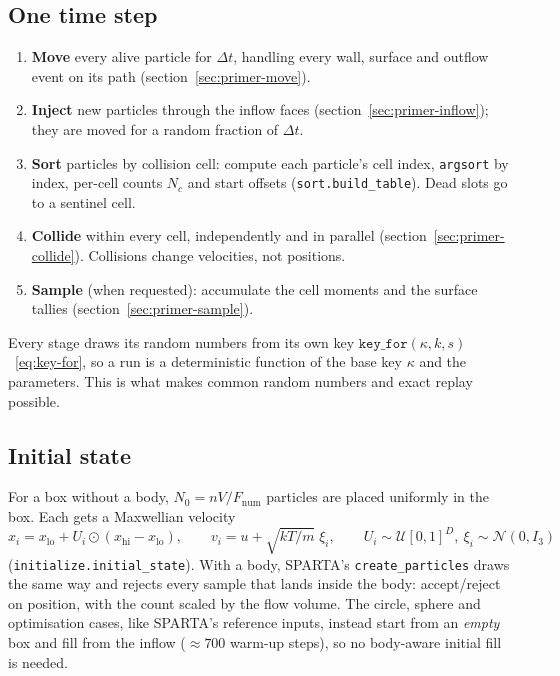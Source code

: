 \documentclass[11pt,a4paper]{article}
\numberwithin{equation}{section}
\newcommand{\code}[1]{\texttt{#1}}
\begin{document}
\subsection{One time step}
\label{sec:primer-step}
\begin{enumerate}
\item \textbf{Move} every alive particle for $\Delta t$, handling every wall, surface
  and outflow event on its path (section~\ref{sec:primer-move}).
\item \textbf{Inject} new particles through the inflow faces
  (section~\ref{sec:primer-inflow}); they are moved for a random fraction of
  $\Delta t$.
\item \textbf{Sort} particles by collision cell: compute each particle's cell index,
  \code{argsort} by index, per-cell counts $N_c$ and start offsets
  (\code{sort.build\_table}).  Dead slots go to a sentinel cell.
\item \textbf{Collide} within every cell, independently and in parallel
  (section~\ref{sec:primer-collide}).  Collisions change velocities, not positions.
\item \textbf{Sample} (when requested): accumulate the cell moments and the surface
  tallies (section~\ref{sec:primer-sample}).
\end{enumerate}
Every stage draws its random numbers from its own key
$\code{key\_for}(\kappa, k, s)$~\eqref{eq:key-for}, so a run is a deterministic
function of the base key $\kappa$ and the parameters.  This is what makes common
random numbers and exact replay possible.

\subsection{Initial state}
\label{sec:primer-init}
For a box without a body, $N_0 = n V/F_{\mathrm{num}}$ particles are placed uniformly
in the box.  Each gets a Maxwellian velocity
\begin{equation}
\label{eq:init}
x_i = x_{\mathrm{lo}} + U_i\odot(x_{\mathrm{hi}} - x_{\mathrm{lo}}),\qquad
v_i = u + \sqrt{kT/m}\;\xi_i,\qquad U_i\sim\mathcal U[0,1]^D,\ \xi_i\sim\mathcal N(0, I_3)
\end{equation}
(\code{initialize.initial\_state}).  With a body, SPARTA's \code{create\_particles}
draws the same way and rejects every sample that lands inside the body: accept/reject on position, with
the count scaled by the flow volume.  The
circle, sphere and optimisation cases, like SPARTA's reference inputs, instead start
from an \emph{empty} box and fill from the inflow ($\approx 700$ warm-up steps),
so no body-aware initial fill is needed.
\end{document}
